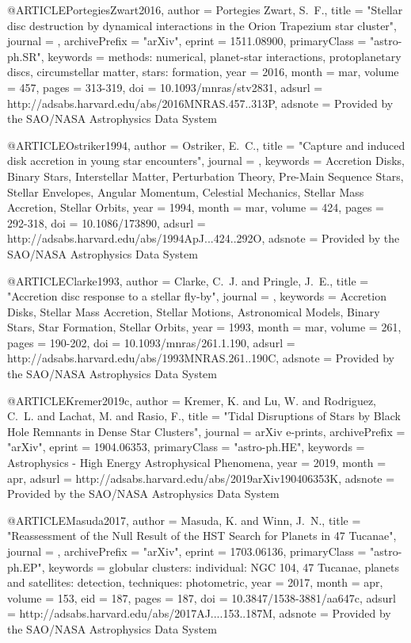 \documentclass[twocolumn,tighten]{aastex63}
\begin{document}
{@ARTICLE{PortegiesZwart2016,
   author = {{Portegies Zwart}, S.~F.},
    title = "{Stellar disc destruction by dynamical interactions in the Orion Trapezium star cluster}",
  journal = {\mnras},
archivePrefix = "arXiv",
   eprint = {1511.08900},
 primaryClass = "astro-ph.SR",
 keywords = {methods: numerical, planet-star interactions, protoplanetary discs, circumstellar matter, stars: formation},
     year = 2016,
    month = mar,
   volume = 457,
    pages = {313-319},
      doi = {10.1093/mnras/stv2831},
   adsurl = {http://adsabs.harvard.edu/abs/2016MNRAS.457..313P},
  adsnote = {Provided by the SAO/NASA Astrophysics Data System}
}

@ARTICLE{Ostriker1994,
   author = {{Ostriker}, E.~C.},
    title = "{Capture and induced disk accretion in young star encounters}",
  journal = {\apj},
 keywords = {Accretion Disks, Binary Stars, Interstellar Matter, Perturbation Theory, Pre-Main Sequence Stars, Stellar Envelopes, Angular Momentum, Celestial Mechanics, Stellar Mass Accretion, Stellar Orbits},
     year = 1994,
    month = mar,
   volume = 424,
    pages = {292-318},
      doi = {10.1086/173890},
   adsurl = {http://adsabs.harvard.edu/abs/1994ApJ...424..292O},
  adsnote = {Provided by the SAO/NASA Astrophysics Data System}
}

@ARTICLE{Clarke1993,
   author = {{Clarke}, C.~J. and {Pringle}, J.~E.},
    title = "{Accretion disc response to a stellar fly-by}",
  journal = {\mnras},
 keywords = {Accretion Disks, Stellar Mass Accretion, Stellar Motions, Astronomical Models, Binary Stars, Star Formation, Stellar Orbits},
     year = 1993,
    month = mar,
   volume = 261,
    pages = {190-202},
      doi = {10.1093/mnras/261.1.190},
   adsurl = {http://adsabs.harvard.edu/abs/1993MNRAS.261..190C},
  adsnote = {Provided by the SAO/NASA Astrophysics Data System}
}

@ARTICLE{Kremer2019c,
   author = {{Kremer}, K. and {Lu}, W. and {Rodriguez}, C.~L. and {Lachat}, M. and 
	{Rasio}, F.},
    title = "{Tidal Disruptions of Stars by Black Hole Remnants in Dense Star Clusters}",
  journal = {arXiv e-prints},
archivePrefix = "arXiv",
   eprint = {1904.06353},
 primaryClass = "astro-ph.HE",
 keywords = {Astrophysics - High Energy Astrophysical Phenomena},
     year = 2019,
    month = apr,
   adsurl = {http://adsabs.harvard.edu/abs/2019arXiv190406353K},
  adsnote = {Provided by the SAO/NASA Astrophysics Data System}
}

@ARTICLE{Masuda2017,
   author = {{Masuda}, K. and {Winn}, J.~N.},
    title = "{Reassessment of the Null Result of the HST Search for Planets in 47 Tucanae}",
  journal = {\aj},
archivePrefix = "arXiv",
   eprint = {1703.06136},
 primaryClass = "astro-ph.EP",
 keywords = {globular clusters: individual: NGC 104, 47 Tucanae, planets and satellites: detection, techniques: photometric},
     year = 2017,
    month = apr,
   volume = 153,
      eid = {187},
    pages = {187},
      doi = {10.3847/1538-3881/aa647c},
   adsurl = {http://adsabs.harvard.edu/abs/2017AJ....153..187M},
  adsnote = {Provided by the SAO/NASA Astrophysics Data System}
}

}
\end{document}
